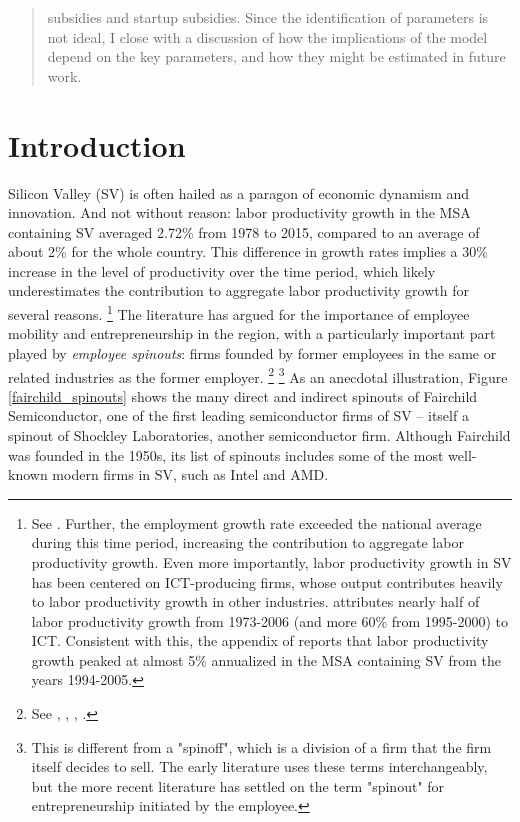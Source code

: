 \documentclass[11pt,english]{article}
\theoremstyle{remark}
\begin{document}
\begin{abstract}
subsidies and startup subsidies. Since the identification of parameters is not ideal, I close with a discussion of how the implications of the model depend on the key parameters, and how they might be estimated in future work. 
	
\end{abstract}

\section{Introduction}



Silicon Valley (SV) is often hailed as a paragon of economic dynamism and innovation. And not without reason: labor productivity growth in the MSA containing SV averaged 2.72\% from 1978 to 2015, compared to an average of about 2\% for the whole country. This difference in growth rates implies a 30\% increase in the level of productivity over the time period, which likely underestimates the contribution to aggregate labor productivity growth for several reasons. \footnote{See \cite{parilla_understanding_2017}. Further, the employment growth rate exceeded the national average during this time period, increasing the contribution to aggregate labor productivity growth. Even more importantly, labor productivity growth in SV has been centered on ICT-producing firms, whose output contributes heavily to labor productivity growth in other industries. \cite{jorgenson_retrospective_2008} attributes nearly half of labor productivity growth from 1973-2006 (and more 60\% from 1995-2000) to ICT. Consistent with this, the appendix of  \cite{parilla_understanding_2017} reports that labor productivity growth peaked at almost 5\% annualized in the MSA containing SV from the years 1994-2005.} The literature has argued for the importance of employee mobility and entrepreneurship in the region, with a particularly important part played by \textit{employee spinouts}: firms founded by former employees in the same or related industries as the former employer. \footnote{See \cite{saxenian_regional_1994}, \cite{gilson_legal_1999}, \cite{fallick_job-hopping_2006}, \cite{franco_covenants_2008}.} \footnote{This is different from a "spinoff", which is a division of a firm that the firm itself decides to sell. The early literature uses these terms interchangeably, but the more recent literature has settled on the term "spinout" for entrepreneurship initiated by the employee.} As an anecdotal illustration, Figure \ref{fairchild_spinouts} shows the many direct and indirect spinouts of Fairchild Semiconductor, one of the first leading semiconductor firms of SV -- itself a spinout of Shockley Laboratories, another semiconductor firm. Although Fairchild was founded in the 1950s, its list of spinouts includes some of the most well-known modern firms in SV, such as Intel and AMD. 
\end{document}
